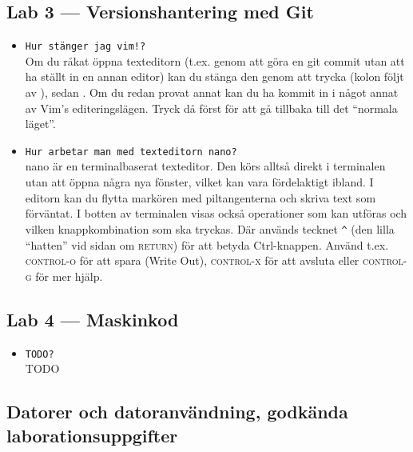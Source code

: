 \documentclass[fleqn, article, a4paper]{memoir}
\newcommand{\commandchar}[1]{\textsc{#1}}
\begin{document}
\subsection{Lab 3 --- Versionshantering med Git}
\begin{itemize}
	\item \texttt{Hur stänger jag vim!?}\\
	      Om du råkat öppna texteditorn  (t.ex. genom att göra en git commit utan att ha ställt in en annan editor) kan du stänga den genom att trycka  (kolon följt av ), sedan . Om du redan provat annat kan du ha kommit in i något annat av Vim's editeringslägen. Tryck då först  för att gå tillbaka till det ``normala läget''.
	\item \texttt{Hur arbetar man med texteditorn nano?} \\
	      nano är en terminalbaserat texteditor. Den körs alltså direkt i terminalen utan att öppna några nya fönster, vilket kan vara fördelaktigt ibland. I editorn kan du flytta markören med piltangenterna och skriva text som förväntat. I botten av terminalen visas också operationer som kan utföras och vilken knappkombination som ska tryckas. Där används tecknet \texttt{\^{}} (den lilla ``hatten'' vid sidan om \commandchar{return}) för att betyda Ctrl-knappen. Använd t.ex. \commandchar{control-o} för att spara (Write Out), \commandchar{control-x} för att avsluta eller \commandchar{control-g} för mer hjälp.
\end{itemize}

\subsection{Lab 4 --- Maskinkod}
\begin{itemize}
	\item \texttt{TODO?}\\
	      TODO
\end{itemize}


\newpage



\newpage



\newpage



\newpage



\newpage

\subsection*{Datorer och datoranvändning, godkända laborationsuppgifter}
\end{document}
